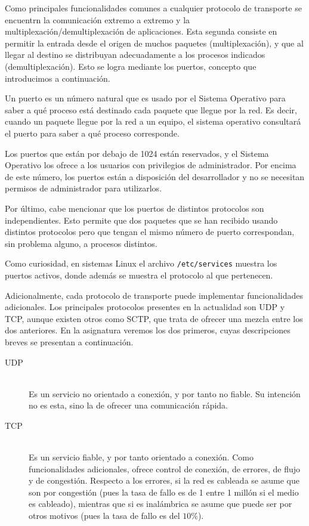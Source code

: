 Como principales funcionalidades comunes a cualquier protocolo de transporte se encuentrn la comunicación extremo a extremo y la multiplexación/demultiplexación de aplicaciones. Esta segunda consiste en permitir la entrada desde el origen de muchos paquetes (multiplexación), y que al llegar al destino se distribuyan adecuadamente a los procesos indicados (demultiplexación). Esto se logra mediante los puertos, concepto que introducimos a continuación.
\begin{definicion}[Puertos]
    Un puerto es un número natural que es usado por el Sistema Operativo para saber a qué proceso está destinado cada paquete que llegue por la red. Es decir, cuando un paquete llegue por la red a un equipo, el sistema operativo consultará el puerto para saber a qué proceso corresponde.
\end{definicion}

Los puertos que están por debajo de 1024 están reservados, y el Sistema Operativo los ofrece a los usuarios con privilegios de administrador. Por encima de este número, los puertos están a disposición del desarrollador y no se necesitan permisos de administrador para utilizarlos.
    
Por último, cabe mencionar que los puertos de distintos protocolos son independientes. Esto permite que dos paquetes que se han recibido usando distintos protocolos pero que tengan el mismo número de puerto correspondan, sin problema alguno, a procesos distintos.
\begin{observacion}
    Como curiosidad, en sistemas Linux el archivo \verb|/etc/services| muestra los puertos activos, donde además se muestra el protocolo al que pertenecen.
\end{observacion}


Adicionalmente, cada protocolo de transporte puede implementar funcionalidades adicionales. Los principales protocolos presentes en la actualidad son \acrshort{UDP} y \acrshort{TCP}, aunque existen otros como \acrshort{SCTP}, que trata de ofrecer una mezcla entre los dos anteriores. En la asignatura veremos los dos primeros, cuyas descripciones breves se presentan a continuación.
\begin{description}
    \item [\acrshort{UDP}]~\\
        Es un servicio no orientado a conexión, y por tanto no fiable. Su intención no es esta, sino la de ofrecer una comunicación rápida.
    \item [\acrshort{TCP}]~\\
        Es un servicio fiable,  y por tanto orientado a conexión. Como funcionalidades adicionales, ofrece control de conexión, de errores, de flujo y de congestión. Respecto a los errores, si la red es cableada se asume que son por congestión (pues la tasa de fallo es de 1 entre 1 millón si el medio es cableado), mientras que si es inalámbrica se asume que puede ser por otros motivos (pues la tasa de fallo es del $10\%$).
\end{description}


